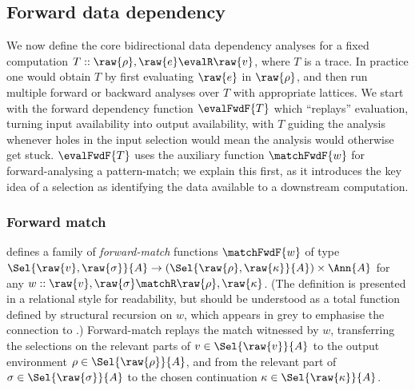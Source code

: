\subsection{Forward data dependency}
\label{sec:data-dependencies:analyses:fwd}

We now define the core bidirectional data dependency analyses for a fixed computation $T :: \raw{\rho}, \raw{e} \evalR \raw{v}$, where $T$ is a trace. In practice one would obtain $T$ by first evaluating $\raw{e}$ in $\raw{\rho}$, and then run multiple forward or backward analyses over $T$ with appropriate lattices. We start with the forward dependency function $\evalFwdF{T}$ which ``replays'' evaluation, turning input availability into output availability, with $T$ guiding the analysis whenever holes in the input selection would mean the analysis would otherwise get stuck. $\evalFwdF{T}$ uses the auxiliary function $\matchFwdF{w}$ for forward-analysing a pattern-match; we explain this first, as it introduces the key idea of a selection as identifying the data available to a downstream computation.



\subsubsection{Forward match}
\label{sec:data-dependencies:analyses:fwd:pattern-match}

 defines a family of \emph{forward-match} functions $\matchFwdF{w}$ of type $\Sel{\raw{v}, \raw{\sigma}}{A} \to (\Sel{\raw{\rho}, \raw{\kappa}}{A}) \times \Ann{A}$ for any $w :: \raw{v}, \raw{\sigma} \matchR \raw{\rho}, \raw{\kappa}$. (The definition is presented in a relational style for readability, but should be understood as a total function defined by structural recursion on $w$, which appears in grey to emphasise the connection to .) Forward-match replays the match witnessed by $w$, transferring the selections on the relevant parts of $v \in \Sel{\raw{v}}{A}$ to the output environment $\rho \in \Sel{\raw{\rho}}{A}$, and from the relevant part of $\sigma \in \Sel{\raw{\sigma}}{A}$ to the chosen continuation $\kappa \in \Sel{\raw{\kappa}}{A}$.

